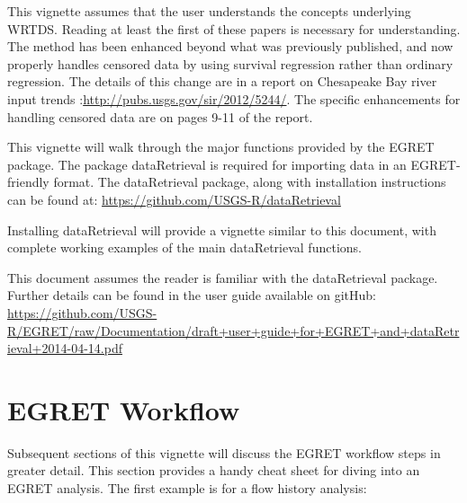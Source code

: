 \documentclass[a4paper,11pt]{article}\usepackage[]{graphicx}\usepackage[]{color}
\begin{document}
This vignette assumes that the user understands the concepts underlying WRTDS.  Reading at least the first of these papers is necessary for understanding.  The method has been enhanced beyond what was previously published, and now properly handles censored data by using survival regression rather than ordinary regression.  The details of this change are in a report on Chesapeake Bay river input trends \cite{HirschIV}:\url{http://pubs.usgs.gov/sir/2012/5244/}.  The specific enhancements for handling censored data are on pages 9-11 of the report.

This vignette will walk through the major functions provided by the EGRET package. The package dataRetrieval is required for importing data in an EGRET-friendly format. The dataRetrieval package, along with installation instructions can be found at:
\url{https://github.com/USGS-R/dataRetrieval}

Installing dataRetrieval will provide a vignette similar to this document, with complete working examples of the main dataRetrieval functions.

This document assumes the reader is familiar with the dataRetrieval package. Further details can be found in the user guide available on gitHub: \url{https://github.com/USGS-R/EGRET/raw/Documentation/draft+user+guide+for+EGRET+and+dataRetrieval+2014-04-14.pdf}

\section{EGRET Workflow}
Subsequent sections of this vignette will discuss the EGRET workflow steps in greater detail. This section provides a handy cheat sheet for diving into an EGRET analysis. The first example is for a flow history analysis:
\end{document}
